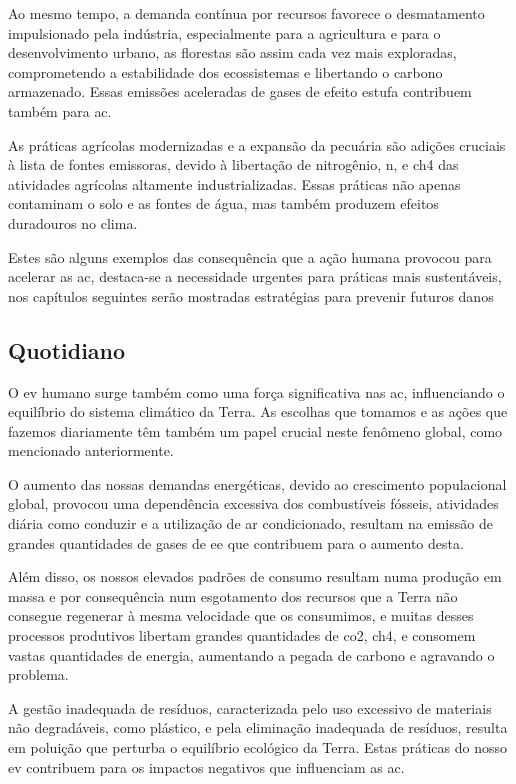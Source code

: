 \documentclass{report}
\begin{document}
Ao mesmo tempo, a demanda contínua por recursos favorece o desmatamento impulsionado pela indústria, especialmente para a agricultura e para o desenvolvimento urbano, as florestas são assim cada vez mais exploradas, comprometendo a estabilidade dos ecossistemas e libertando o carbono armazenado. Essas emissões aceleradas de gases de efeito estufa contribuem também para \ac{ac}.

As práticas agrícolas modernizadas e a expansão da pecuária são adições cruciais à lista de fontes emissoras, devido à libertação de nitrogênio, \ac{n}, e \ac{ch4} das atividades agrícolas altamente industrializadas. Essas práticas não apenas contaminam o solo e as fontes de água, mas também produzem efeitos duradouros no clima.

Estes são alguns exemplos das consequência que a ação humana provocou para acelerar as \ac{ac}, destaca-se a necessidade urgentes para práticas mais sustentáveis, nos capítulos seguintes serão mostradas estratégias para prevenir futuros danos 

\subsection{Quotidiano}
O \ac{ev} humano surge também como uma força significativa nas \ac{ac}, influenciando o equilíbrio do sistema climático da Terra. As escolhas que tomamos  e as ações que fazemos diariamente têm também um papel crucial neste fenômeno global, como mencionado anteriormente.

O aumento das nossas demandas energéticas, devido ao crescimento populacional global, provocou uma dependência excessiva dos combustíveis fósseis, atividades diária como conduzir e a utilização de ar condicionado, resultam na emissão de grandes quantidades de gases de \ac{ee} que contribuem para o aumento desta.

Além disso, os nossos elevados padrões de consumo resultam numa produção em massa e por consequência num esgotamento dos recursos que a Terra não consegue regenerar à mesma velocidade que os consumimos, e muitas desses processos produtivos libertam grandes quantidades de \ac{co2},  \ac{ch4}, e consomem vastas quantidades de energia, aumentando a pegada de carbono e agravando o problema.

A gestão inadequada de resíduos, caracterizada pelo uso excessivo de materiais não degradáveis, como plástico, e pela eliminação inadequada de resíduos, resulta em poluição que perturba o equilíbrio ecológico da Terra. Estas práticas do nosso \ac{ev} contribuem para os impactos negativos que influenciam as \ac{ac}.
\end{document}
